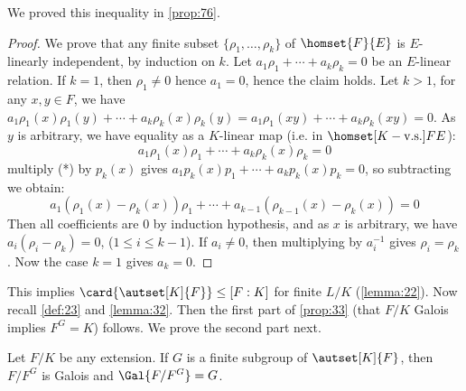 We proved this inequality in \autoref{prop:76}.

\begin{proof}
  We prove that any finite subset $\{ \rho_1, \ldots, \rho_k \}$ of $\homset{F}{E}$ is $E$-linearly independent, by induction on $k$. Let $a_1\rho_1 + \cdots + a_k\rho_k = 0 \tag{*}$ be an $E$-linear relation. If $k = 1$, then $\rho_1 \neq 0$ hence $a_1 = 0$, hence the claim holds. Let $k > 1$, for any $x, y \in F$, we have $a_1\rho_1(x)\rho_1(y) + \cdots + a_k\rho_k(x)\rho_k(y) = a_1\rho_1(xy) + \cdots + a_k\rho_k(xy) = 0$. As $y$ is arbitrary, we have equality as a $K$-linear map (i.e. in $\homset[K-\text{v.s.}]{F}{E}$):
\[
a_1\rho_1(x)\rho_1 + \cdots + a_k\rho_k(x)\rho_k = 0
\]
multiply (*) by $p_k(x)$ gives $a_1p_k(x)p_1 + \cdots + a_kp_k(x)p_k = 0$, so subtracting we obtain:
\[
a_1(\rho_1(x)-\rho_k(x))\rho_1 + \cdots + a_{k-1}(\rho_{k-1}(x)-\rho_k(x)) = 0
\]
Then all coefficients are 0 by induction hypothesis, and as $x$ is arbitrary, we have $a_i(\rho_i -\rho_k) = 0$, ($1 \leq i \leq k-1$). If $a_i \neq 0$, then multiplying by $a_i^{-1}$ gives $\rho_i = \rho_k$. Now the case $k = 1$ gives $a_k = 0$.
\end{proof}

This implies $\card{\autset[K]{F}} \leq [F : K]$ for finite $L/K$ (\autoref{lemma:22}). Now recall \autoref{def:23} and \autoref{lemma:32}. Then the first part of \autoref{prop:33} (that $F/K$ Galois implies $F^G = K$) follows. We prove the second part next.

\begin{proposition}
  \label{prop:88}
  Let $F/K$ be any extension. If $G$ is a finite subgroup of $\autset[K]{F}$, then $F/F^G$ is Galois and $\Gal{F/F^G} = G$.
\end{proposition}

